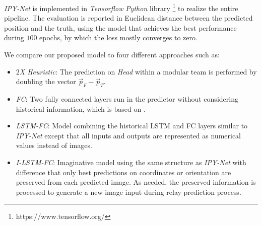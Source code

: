 \documentclass[letterpaper, 10 pt, conference]{ieeeconf}  %
\begin{document}
	\emph{IPY-Net} is implemented in \emph{Tensorflow} \emph{Python} library \footnote{https://www.tensorflow.org/} 
	to realize the entire pipeline. The evaluation is reported in Euclidean distance between 
	the predicted position and the truth, using the model that achieves the best performance 
	during $100$ epochs, by which the loss mostly converges to zero. 

	We compare our proposed model to four different approaches such as: 
	\begin{itemize}
		\item \emph{$2$X Heuristic}: 
		The prediction on \emph{Head} within a modular team is performed by doubling the vector 
		$\vec{p}_{F} - \vec{p}_{T}$.
		
		\item \emph{FC}: 
		Two fully connected layers run in the predictor without considering historical 
		information, which is based on \cite{Choi17}.  
				
		\item \emph{LSTM-FC}: 
		Model combining the historical LSTM and FC layers similar to \emph{IPY-Net} except that 
		all inputs and outputs are represented as numerical values instead of images. 
		
		\item \emph{I-LSTM-FC}: 
		Imaginative model using the same structure as \emph{IPY-Net} with difference that 
		only best predictions on coordinates or orientation are preserved from each predicted image. 
		As needed, the preserved information is processed to generate a new image input during 
		relay prediction process.
	\end{itemize}	

	
	
\end{document}
